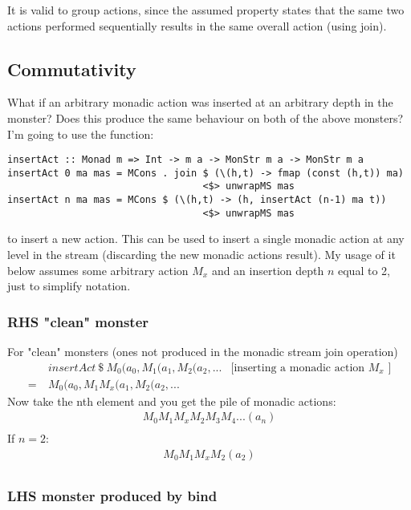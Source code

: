\documentclass{article}
\begin{document}
It is valid to group actions, since the assumed property states that the same two actions performed sequentially results in the same overall action (using join).

\subsection{Commutativity}

What if an arbitrary monadic action was inserted at an arbitrary depth in the monster? Does this produce the same behaviour on both of the above monsters?\\

I'm going to use the function:
\begin{lstlisting}
insertAct :: Monad m => Int -> m a -> MonStr m a -> MonStr m a
insertAct 0 ma mas = MCons . join $ (\(h,t) -> fmap (const (h,t)) ma) 
                                  <$> unwrapMS mas
insertAct n ma mas = MCons $ (\(h,t) -> (h, insertAct (n-1) ma t)) 
                                  <$> unwrapMS mas
\end{lstlisting}
to insert a new action. This can be used to insert a single monadic action at any level in the stream (discarding the new monadic actions result). My usage of it below assumes some arbitrary action $M_x$ and an insertion depth $n$ equal to 2, just to simplify notation.

\subsubsection{RHS "clean" monster}

For "clean" monsters (ones not produced in the monadic stream join operation)
\begin{align*}
& insertAct\ \$\ M_0(a_0, M_1(a_1, M_2 (a_2,... & \text{[inserting a monadic action $M_x$ ]}\\
=\ & M_0(a_0, M_1M_x(a_1, M_2 (a_2,... 
\end{align*}
Now take the nth element and you get the pile of monadic actions:
\begin{align*}
M_0M_1M_xM_2M_3M_4... (a_n)\\
\end{align*}
If $n = 2$:
\begin{align*}
M_0M_1M_xM_2 (a_2)\\
\end{align*}

\subsubsection{LHS monster produced by bind}
\end{document}
